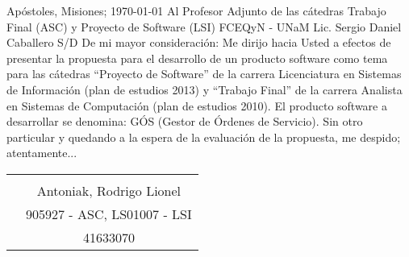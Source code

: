 \null\hfill
\normalsize{
Ap\'ostoles, Misiones; \today
}
\vspace{0.5cm}
\newline
\normalsize{
Al Profesor Adjunto de las c\'atedras
}
\newline
\normalsize{
Trabajo Final (ASC) y Proyecto de Software (LSI)
}
\newline
\normalsize{
FCEQyN - UNaM
}
\newline
\normalsize{
Lic. Sergio Daniel Caballero
}
\newline
\normalsize{
S/D
}
\vspace{0.5cm}
\newline
\normalsize{
De mi mayor consideración:
}
\vspace{0.5cm}
\newline
\setlength\parindent{5.5cm}
\normalsize{ \indent
Me dirijo hacia Usted a efectos de presentar la
propuesta para el desarrollo de un producto software
como tema para las c\'atedras “Proyecto de Software”
de la carrera Licenciatura en Sistemas de Informaci\'on
(plan de estudios 2013) y “Trabajo Final” de la carrera
Analista en Sistemas de Computaci\'on (plan de estudios
2010).
}
\newline
\normalsize{ \indent
El producto software a desarrollar se denomina: G\'OS
(Gestor de \'Ordenes de Servicio).
}
\newline
\normalsize{ \indent
Sin otro particular y quedando a la espera de la
evaluaci\'on de la propuesta, me despido; atentamente...
}
\vspace{5cm}
\newline
\setlength\parindent{0.5cm}
\begin{tabular}{ p{7cm} c }
	\vspace{0.25cm} & \underline{\hspace{6cm}} \\ 
	\vspace{0.25cm} & Antoniak, Rodrigo Lionel \\ 
	\vspace{0.25cm} & 905927 - ASC, LS01007 - LSI \\  
	\vspace{0.25cm} & 41633070
\end{tabular}

